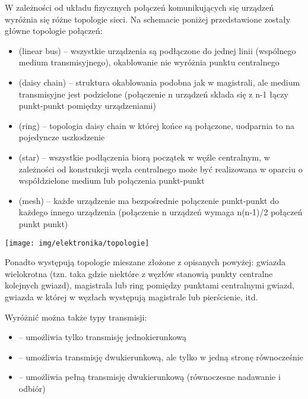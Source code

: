 W zależności od układu fizycznych połączeń komunikujących się urządzeń wyróżnia się różne topologie sieci.
Na schemacie poniżej przedstawione zostały główne topologie połączeń:

\begin{itemize}
\item {} (linear bus) -- wszystkie urządzenia są podłączone do jednej linii (wspólnego medium transmisyjnego), okablowanie nie wyróżnia punktu centralnego
\item {} (daisy chain) -- struktura okablowania podobna jak w magistrali, ale medium transmisyjne jest podzielone (połączenie n urządzeń składa się z n-1 łączy punkt-punkt pomiędzy urządzeniami)
\item {} (ring) -- topologia daisy chain w której końce są połączone, uodparnia to na pojedyncze uszkodzenie
\item {} (star) -- wszystkie podłączenia biorą początek w węźle centralnym, w zależności od konstrukcji węzła centralnego może być realizowana w oparciu o współdzielone medium lub połączenia punkt-punkt
\item {} (mesh) -- każde urządzenie ma bezpośrednie połączenie punkt-punkt do każdego innego urządzenia (połączenie n urządzeń wymaga n(n-1)/2 połączeń punkt punkt)
\end{itemize}

\begin{center}
    \texttt{[image: img/elektronika/topologie]}
\end{center}

Ponadto występują topologie mieszane złożone z opisanych powyżej: gwiazda wielokrotna (tzn. taka gdzie niektóre z węzłów stanowią punkty centralne kolejnych gwiazd), magistrala lub ring pomiędzy punktami centralnymi gwiazd, gwiazda w której w węzłach występują magistrale lub pierścienie, itd.

\vspace{7pt}

Wyróżnić można także typy transmisji:
\begin{itemize}
\item {} -- umożliwia tylko transmisję jednokierunkową
\item {} -- umożliwia transmisję dwukierunkową, ale tylko w jedną stronę równocześnie
\item {} -- umożliwia pełną transmisję dwukierunkową (równoczesne nadawanie i odbiór)
\end{itemize}

